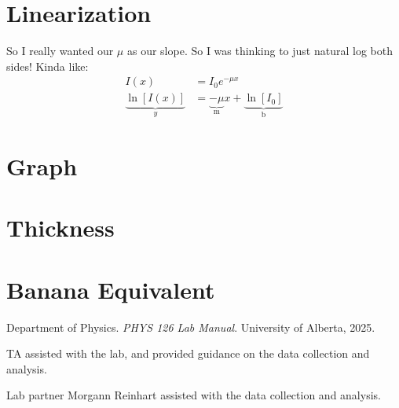 \documentclass[12pt]{article}
\begin{document}
\section{Linearization}

So I really wanted our $\mu$ as our slope. So I was thinking to just natural log both sides! Kinda like:
\begin{align*}
    I(x) &= I_0 e^{-\mu x} \\
    \underbrace{\ln[I(x)]}_{y} &= \underbrace{-\mu}_{\text{m}} x + \underbrace{\ln[I_0]}_{\text{b}}
\end{align*}

\section{Graph}



\section{Thickness}

\section{Banana Equivalent}

\begin{thebibliography}{9}
    Department of Physics. \textit{PHYS 126 Lab Manual}. University of Alberta, 2025.

    TA assisted with the lab, and provided guidance on the data collection and analysis.

    Lab partner Morgann Reinhart assisted with the data collection and analysis.
    
\end{thebibliography}
\end{document}
